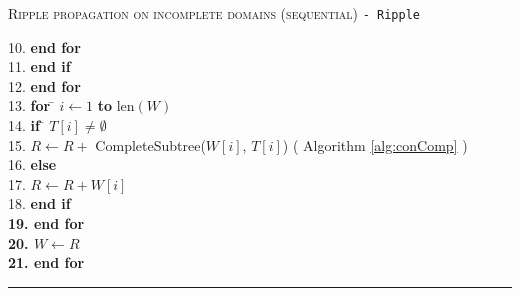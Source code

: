 \begin{table}
\begin{algorithm}{ \textsc{Ripple propagation on incomplete domains (sequential)} \tt{- Ripple}}
\begin{tabbing}
10. \>\>\> {\bf end for}\\ 
11. \>\> {\bf end if}\\ 
12. \> {\bf end for}\\ 
13. \> {\bf for} \= $i \leftarrow 1$ {\bf to} len$(W)$\\
14. \>\> {\bf if} \= $T[i] \neq \emptyset$\\
15. \>\>\> $R \leftarrow R + $ CompleteSubtree($W[i]$, $T[i]$) ( Algorithm \ref{alg:conComp} ) \\
16. \>\> {\bf else}\\
17. \>\>\> $R \leftarrow R + W[i]$ \\
18. \>\> \bf{end if}\\
19. \> \bf{end for}\\
20. \>$W \leftarrow R$\\
21. \bf{end for}
\end{tabbing}
\label{alg:ripple}
\end{algorithm}
\rule{\textwidth}{0.01mm}
\end{table}

